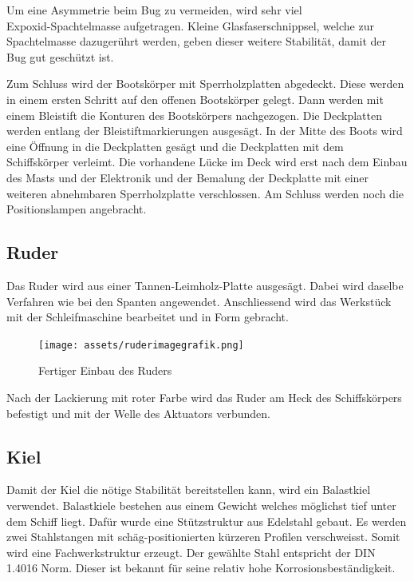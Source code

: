 Um eine Asymmetrie beim Bug zu vermeiden, wird sehr viel \\Expoxid-Spachtelmasse aufgetragen. Kleine Glasfaserschnippsel, welche zur Spachtelmasse dazugerührt werden, geben dieser weitere Stabilität, damit der Bug gut geschützt ist.

Zum Schluss wird der Bootskörper mit Sperrholzplatten abgedeckt. Diese werden in einem ersten Schritt auf den offenen Bootskörper gelegt. Dann werden mit einem Bleistift die Konturen des Bootskörpers nachgezogen. Die Deckplatten werden entlang der Bleistiftmarkierungen ausgesägt. In der Mitte des Boots wird eine Öffnung in die Deckplatten gesägt und die Deckplatten mit dem Schiffskörper verleimt. Die vorhandene Lücke im Deck wird erst nach dem Einbau des Masts und der Elektronik und der Bemalung der Deckplatte mit einer weiteren abnehmbaren Sperrholzplatte verschlossen. Am Schluss werden noch die Positionslampen angebracht. 
\subsection{Ruder}
Das Ruder wird aus einer Tannen-Leimholz-Platte ausgesägt. Dabei wird daselbe Verfahren wie bei den Spanten angewendet. Anschliessend wird das Werkstück mit der Schleifmaschine bearbeitet und in Form gebracht. 
\begin{figure}[H]
    \centering
    \texttt{[image: assets/ruderimagegrafik.png]}
    \caption{Fertiger Einbau des Ruders}
    
\end{figure}

Nach der Lackierung mit roter Farbe wird das Ruder am Heck des Schiffskörpers befestigt und mit der Welle des Aktuators verbunden.
\subsection{Kiel}

Damit der Kiel die nötige Stabilität bereitstellen kann, wird ein Balastkiel verwendet. Balastkiele bestehen aus einem Gewicht welches möglichst tief unter dem Schiff liegt. Dafür wurde eine Stützstruktur aus Edelstahl gebaut. Es werden zwei Stahlstangen mit schäg-positionierten kürzeren Profilen verschweisst. Somit wird eine Fachwerkstruktur erzeugt.
Der gewählte Stahl entspricht der DIN 1.4016 Norm. Dieser ist bekannt für seine relativ hohe Korrosionsbeständigkeit.\cite{MAR2025STEEL}

